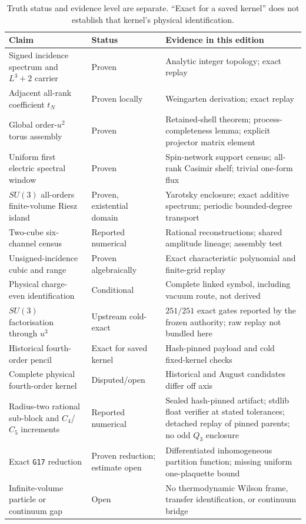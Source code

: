 \documentclass[11pt]{article}
\theoremstyle{plain}
\theoremstyle{definition}
\theoremstyle{remark}
\begin{document}
\begin{table}[ht]
\centering
\small
\begin{tabular}{@{}p{}p{}p{}@{}}
\toprule
Claim & Status & Evidence in this edition \\
\midrule
Signed incidence spectrum and $L^3+2$ carrier
 & Proven & Analytic integer topology; exact replay \\
Adjacent all-rank coefficient $t_N$
 & Proven locally & Weingarten derivation; exact replay \\
Global order-$u^2$ torus assembly
 & Proven & Retained-shell theorem; process-completeness lemma; explicit projector matrix element \\
Uniform first electric spectral window
 & Proven & Spin-network support census; all-rank Casimir shelf; trivial one-form flux \\
$SU(3)$ all-orders finite-volume Riesz island
 & Proven, existential domain & Yarotsky enclosure; exact additive spectrum; periodic bounded-degree transport \\
Two-cube six-channel census
 & Reported numerical & Rational reconstructions; shared amplitude lineage; assembly test \\
Unsigned-incidence cubic and range
 & Proven algebraically & Exact characteristic polynomial and finite-grid replay \\
Physical charge-even identification
 & Conditional & Complete linked symbol, including vacuum route, not derived \\
$SU(3)$ factorisation through $u^3$
 & Upstream cold-exact & $251/251$ exact gates reported by the frozen authority; raw replay not bundled here \\
Historical fourth-order pencil
 & Exact for saved kernel & Hash-pinned payload and cold fixed-kernel checks \\
Complete physical fourth-order kernel
 & Disputed/open & Historical and August candidates differ off axis \\
Radius-two rational sub-block and $C_4$/$C_5$ increments
 & Reported numerical & Sealed hash-pinned artifact; stdlib float verifier at stated tolerances; detached replay of pinned parents; no odd $Q_3$ enclosure \\
Exact \texttt{G17} reduction
 & Proven reduction; estimate open & Differentiated inhomogeneous partition function; missing uniform one-plaquette bound \\
Infinite-volume particle or continuum gap
 & Open & No thermodynamic Wilson frame, transfer identification, or continuum bridge \\
\bottomrule
\end{tabular}
\caption{Truth status and evidence level are separate. ``Exact for a saved
kernel'' does not establish that kernel's physical identification.}
\label{tab:evidence}
\end{table}
\end{document}
